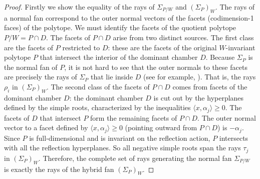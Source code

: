 \documentclass{amsart}
\theoremstyle{definition}
\theoremstyle{remark}
\numberwithin{equation}{section}
\begin{document}
\begin{proof}
Firstly we show the equality of the rays of $\Sigma_{P/W}$ and $(\Sigma_P)_W$.
The rays of a normal fan correspond to the outer normal vectors of the facets (codimension-1 faces) of the polytope. We must identify the facets of the quotient polytope $P/W = P \cap D$. 
The facets of $P \cap D$ arise from two distinct sources. The first class are the facets of $P$ restricted to $D$: these are the facets of the original $W$-invariant polytope $P$ that intersect the interior of the dominant chamber $D$. Because $\Sigma_P$ is the normal fan of $P$, it is not hard to see that the outer normals to these facets are precisely the rays of $\Sigma_P$ that lie inside $D$ (see for example, \cite[Lemma 2.2 and Proposition 2.4]{gong2026invariants}). That is, the rays $\rho_i$ in $(\Sigma_P)_W$. The second class of the facets of $P \cap D$ comes from facets of the dominant chamber $D$: the dominant chamber $D$ is cut out by the hyperplanes defined by the simple roots, characterized by the inequalities $\langle x, \alpha_j \rangle \ge 0$. The facets of $D$ that intersect $P$ form the remaining facets of $P \cap D$. The outer normal vector to a facet defined by $\langle x, \alpha_j \rangle \ge 0$ (pointing outward from $P \cap D$) is $-\alpha_j$. Since $P$ is full-dimensional and is invariant on the reflection action, $P$ intersects with all the reflection hyperplanes. So all negative simple roots span the rays $\tau_j$ in $(\Sigma_P)_W$. Therefore, the complete set of rays generating the normal fan $\Sigma_{P/W}$ is exactly the rays of the hybrid fan $(\Sigma_P)_W$.


\end{proof}
\end{document}
